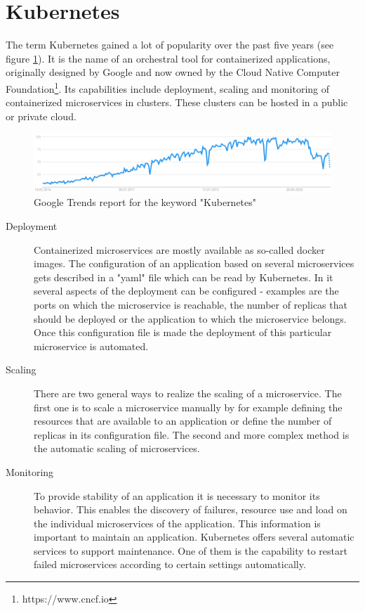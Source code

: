 \documentclass[
	english,
	ruledheaders=section,%
	class=report,%
	thesis={type=master},%
	accentcolor=8c,%
	custommargins=true,%
	marginpar=false,%
	parskip=half-,%
	fontsize=11pt,%
]{tudapub}
\begin{document}
\section{Kubernetes}
The term Kubernetes gained a lot of popularity over the past five years (see figure \ref{fig:google-trends-kubernetes}). It is the name of an orchestral tool for containerized applications, originally designed by Google and now owned by the Cloud Native Computer Foundation\footnote{https://www.cncf.io}. Its capabilities include deployment, scaling and monitoring of containerized microservices in clusters. These clusters can be hosted in a public or private cloud.\\
\begin{figure}[h]
    \centering
    \includegraphics[width=\textwidth]{data/basics/google_trends_kubernetes.png}
    \caption{Google Trends report for the keyword "Kubernetes" \cite{googletrends2020}}
    \label{fig:google-trends-kubernetes}
\end{figure}
\begin{description}
\item[Deployment] Containerized microservices are mostly available as so-called docker images. The configuration of an application based on several microservices gets described in a "yaml" file which can be read by Kubernetes. In it several aspects of the deployment can be configured - examples are the ports on which the microservice is reachable, the number of replicas that should be deployed or the application to which the microservice belongs. Once this configuration file is made the deployment of this particular microservice is automated. 
\item[Scaling] There are two general ways to realize the scaling of a microservice. The first one is to scale a microservice manually by for example defining the resources that are available to an application or define the number of replicas in its configuration file. The second and more complex method is the automatic scaling of microservices.
\item[Monitoring] To provide stability of an application it is necessary to monitor its behavior. This enables the discovery of failures, resource use and load on the individual microservices of the application. This information is important to maintain an application. Kubernetes offers several automatic services to support maintenance. One of them is the capability to restart failed microservices according to certain settings automatically.
\end{description}
\end{document}
